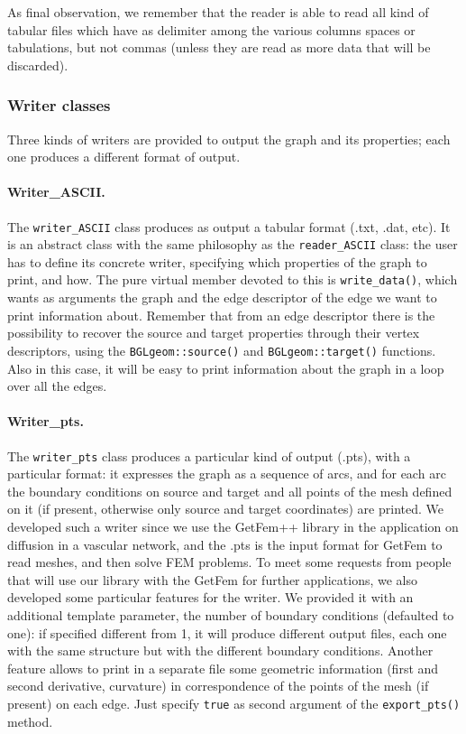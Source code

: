 \documentclass[10pt]{article} %
\begin{document}
	As final observation, we remember that the reader is able to read all kind of tabular files which have as delimiter among the various columns spaces or tabulations, but not commas (unless they are read as more data that will be discarded).
	
	\subsubsection{Writer classes}
	Three kinds of writers are provided to output the graph and its properties; each one produces a different format of output.
	\paragraph{Writer\_ASCII.} The \texttt{writer\_ASCII} class produces as output a tabular format (.txt, .dat, etc). It is an abstract class with the same philosophy as the \texttt{reader\_ASCII} class: the user has to define its concrete writer, specifying which properties of the graph to print, and how. The pure virtual member devoted to this is \texttt{write\_data()}, which wants as arguments the graph and the edge descriptor of the edge we want to print information about. Remember that from an edge descriptor there is the possibility to recover the source and target properties through their vertex descriptors, using the \texttt{BGLgeom::source()} and \texttt{BGLgeom::target()} functions. Also in this case, it will be easy to print information about the graph in a loop over all the edges.
	\paragraph{Writer\_pts.} The \texttt{writer\_pts} class produces a particular kind of output (.pts), with a particular format: it expresses the graph as a sequence of arcs, and for each arc the boundary conditions on source and target and all points of the mesh defined on it (if present, otherwise only source and target coordinates) are printed. We developed such a writer since we use the GetFem++ library in the application on diffusion in a vascular network, and the .pts is the input format for GetFem to read meshes, and then solve FEM problems. \newline
	To meet some requests from people that will use our library with the GetFem for further applications, we also developed some particular features for the writer. We provided it with an additional template parameter, the number of boundary conditions (defaulted to one): if specified different from 1, it will produce different output files, each one with the same structure but with the different boundary conditions. Another feature allows to print in a separate file some geometric information (first and second derivative, curvature) in correspondence of the points of the mesh (if present) on each edge. Just specify \texttt{true} as second argument of the \texttt{export\_pts()} method.
\end{document}
